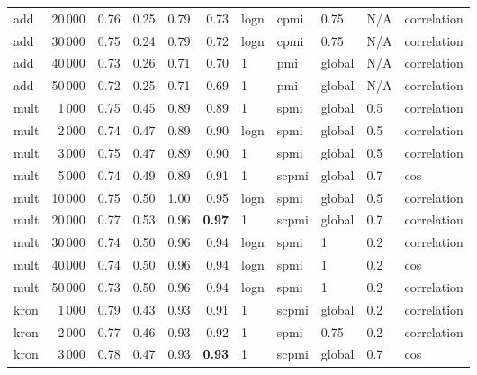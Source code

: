 \begin{tabular}{lrrrrrlllll}
     add &           20\,000 &  0.76 &  0.25 &       0.79 &           0.73 &  logn &   cpmi &    0.75 &  N/A &    correlation \\
     add &           30\,000 &  0.75 &  0.24 &       0.79 &           0.72 &  logn &   cpmi &    0.75 &  N/A &    correlation \\
     add &           40\,000 &  0.73 &  0.26 &       0.71 &           0.70 &     1 &    pmi &  global &  N/A &    correlation \\
     add &           50\,000 &  0.72 &  0.25 &       0.71 &           0.69 &     1 &    pmi &  global &  N/A &    correlation \\ \addlinespace
    mult &            1\,000 &  0.75 &  0.45 &       0.89 &           0.89 &     1 &   spmi &  global &  0.5 &    correlation \\
    mult &            2\,000 &  0.74 &  0.47 &       0.89 &           0.90 &  logn &   spmi &  global &  0.5 &    correlation \\
    mult &            3\,000 &  0.75 &  0.47 &       0.89 &           0.90 &     1 &   spmi &  global &  0.5 &    correlation \\
    mult &            5\,000 &  0.74 &  0.49 &       0.89 &           0.91 &     1 &  scpmi &  global &  0.7 &            cos \\
    mult &           10\,000 &  0.75 &  0.50 &       1.00 &           0.95 &  logn &   spmi &  global &  0.5 &    correlation \\
    mult &           20\,000 &  0.77 &  0.53 &       0.96 &           \textbf{0.97} &     1 &  scpmi &  global &  0.7 &    correlation \\
    mult &           30\,000 &  0.74 &  0.50 &       0.96 &           0.94 &  logn &   spmi &       1 &  0.2 &    correlation \\
    mult &           40\,000 &  0.74 &  0.50 &       0.96 &           0.94 &  logn &   spmi &       1 &  0.2 &            cos \\
    mult &           50\,000 &  0.73 &  0.50 &       0.96 &           0.94 &  logn &   spmi &       1 &  0.2 &    correlation \\ \addlinespace
    kron &            1\,000 &  0.79 &  0.43 &       0.93 &           0.91 &     1 &  scpmi &  global &  0.2 &    correlation \\
    kron &            2\,000 &  0.77 &  0.46 &       0.93 &           0.92 &     1 &   spmi &    0.75 &  0.2 &    correlation \\
    kron &            3\,000 &  0.78 &  0.47 &       0.93 &           \textbf{0.93} &     1 &  scpmi &  global &  0.7 &            cos \\

\end{tabular}
